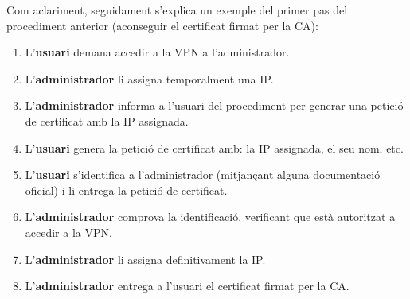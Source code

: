 Com aclariment, seguidament s'explica un exemple del primer pas del procediment anterior (aconseguir el certificat firmat per la CA):
\begin{enumerate}
\item L'\textbf{usuari} demana accedir a la VPN a l'administrador.
\item L'\textbf{administrador} li assigna temporalment una IP.
\item L'\textbf{administrador} informa a l'usuari del procediment per generar una petició de certificat amb la IP assignada.
\item L'\textbf{usuari} genera la petició de certificat amb: la IP assignada, el seu nom, etc.
\item L'\textbf{usuari} s'identifica a l'administrador (mitjançant alguna documentació oficial) i li entrega la petició de certificat.
\item L'\textbf{administrador} comprova la identificació, verificant que està autoritzat a accedir a la VPN.
\item L'\textbf{administrador} li assigna definitivament la IP.
\item L'\textbf{administrador} entrega a l'usuari el certificat firmat per la CA.
\end{enumerate}
